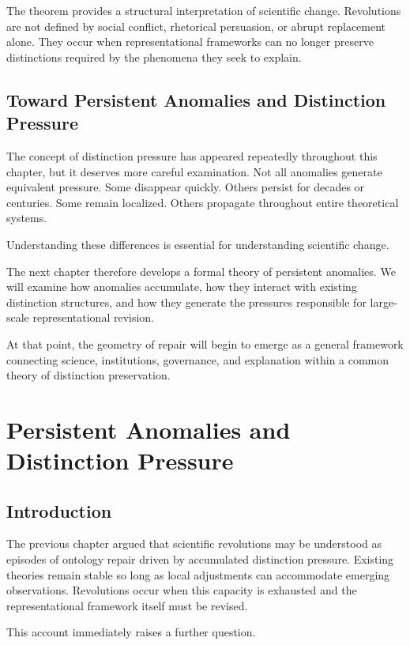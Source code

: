 \documentclass[11pt,oneside,openany]{book}
\begin{document}
The theorem provides a structural interpretation of scientific change. Revolutions are not defined by social conflict, rhetorical persuasion, or abrupt replacement alone. They occur when representational frameworks can no longer preserve distinctions required by the phenomena they seek to explain.

\section{Toward Persistent Anomalies and Distinction Pressure}

The concept of distinction pressure has appeared repeatedly throughout this chapter, but it deserves more careful examination. Not all anomalies generate equivalent pressure. Some disappear quickly. Others persist for decades or centuries. Some remain localized. Others propagate throughout entire theoretical systems.

Understanding these differences is essential for understanding scientific change.

The next chapter therefore develops a formal theory of persistent anomalies. We will examine how anomalies accumulate, how they interact with existing distinction structures, and how they generate the pressures responsible for large-scale representational revision.

At that point, the geometry of repair will begin to emerge as a general framework connecting science, institutions, governance, and explanation within a common theory of distinction preservation.

\chapter{Persistent Anomalies and Distinction Pressure}

\section{Introduction}

The previous chapter argued that scientific revolutions may be understood as episodes of ontology repair driven by accumulated distinction pressure. Existing theories remain stable so long as local adjustments can accommodate emerging observations. Revolutions occur when this capacity is exhausted and the representational framework itself must be revised.

This account immediately raises a further question.
\end{document}
